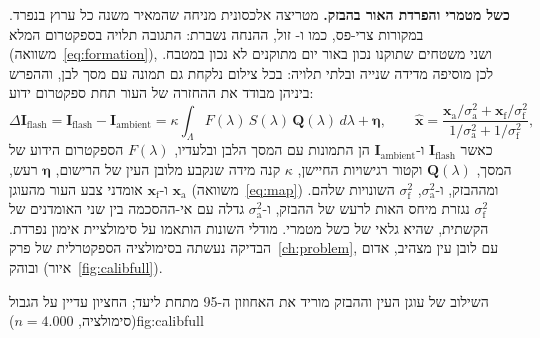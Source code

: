 \textbf{כשל מטמרי והפרדת האור בהבזק.} מטריצה אלכסונית מניחה שהמאיר משנה כל ערוץ בנפרד. במקורות צרי-פס, כמו  ו- זול, ההנחה נשברת: התגובה תלויה בספקטרום המלא (משוואה~\eqref{eq:formation}), ושני משטחים שתוקנו נכון באור יום מתוקנים לא נכון במטבח. לכן  מוסיפה מדידה שנייה ובלתי תלויה: בכל צילום נלקחת גם תמונה עם מסך לבן, וההפרש ביניהן מבודד את ההחזרה של העור תחת ספקטרום ידוע:
\begin{equation}
\Delta\mathbf{I}_{\text{flash}} = \mathbf{I}_{\text{flash}} - \mathbf{I}_{\text{ambient}} = \kappa\!\int_{\Lambda} F(\lambda)\, S(\lambda)\, \mathbf{Q}(\lambda)\, d\lambda + \boldsymbol{\eta}, \qquad
\hat{\mathbf{x}} = \frac{\mathbf{x}_{\text{a}}/\sigma^2_{\text{a}} + \mathbf{x}_{\text{f}}/\sigma^2_{\text{f}}}{1/\sigma^2_{\text{a}} + 1/\sigma^2_{\text{f}}},
\label{eq:flash}
\end{equation}
כאשר $\mathbf{I}_{\text{flash}}$ ו-$\mathbf{I}_{\text{ambient}}$ הן התמונות עם המסך הלבן ובלעדיו, $F(\lambda)$ הספקטרום הידוע של המסך, $\mathbf{Q}(\lambda)$ וקטור רגישויות החיישן, $\kappa$ קנה מידה שנקבע מלובן העין של הרישום, $\boldsymbol{\eta}$ רעש, $\mathbf{x}_{\text{a}}$ ו-$\mathbf{x}_{\text{f}}$ אומדני צבע העור מהעוגן (משוואה~\eqref{eq:map}) ומההבזק, ו-$\sigma^2_{\text{a}}$, $\sigma^2_{\text{f}}$ השונויות שלהם. $\sigma^2_{\text{f}}$ נגזרת מיחס האות לרעש של ההבזק, ו-$\sigma^2_{\text{a}}$ גדלה עם אי-ההסכמה בין שני האומדנים של הקשתית, שהיא גלאי של כשל מטמרי. מודלי השונות הותאמו על סימולציית אימון נפרדת. הבדיקה נעשתה בסימולציה הספקטרלית של פרק~\ref{ch:problem}, עם לובן עין מצהיב, אדום ובוהק (איור~\ref{fig:calibfull}).

\begin{reportfigure}{השילוב של עוגן העין וההבזק מוריד את האחוזון ה-\num{95} מתחת ליעד; החציון עדיין על הגבול (סימולציה, $n=\num{4,000}$)}{fig:calibfull}
\end{reportfigure}

